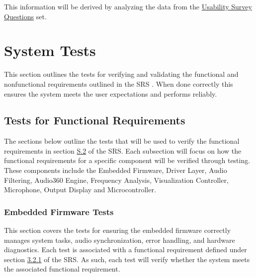 \documentclass[12pt, titlepage]{article}
\begin{document}
This information will be derived by analyzing the data from the 
\hyperref[sec:usability_survery_questions]{Usability Survey Questions} set.

\section{System Tests} \label{sec:system_tests}

This section outlines the tests for verifying and validating the functional and
nonfunctional requirements outlined in the SRS \cite{SRS}. When done correctly
this ensures the system meets the user expectations and performs reliably. 

\subsection{Tests for Functional Requirements}

The sections below outline the tests that will be used to verify the functional
requirements in section \hyperref[SRS-sec:S.2]{S.2} of the SRS. Each subsection
will focus on how the functional requirements for a specific component will be
verified through testing. These components include the Embedded Firmware, Driver
Layer, Audio Filtering, Audio360 Engine, Frequency Analysis, Visualization
Controller, Microphone, Output Display and Microcontroller. 

\subsubsection{Embedded Firmware Tests}

This section covers the tests for ensuring the embedded firmware correctly
manages system tasks, audio synchronization, error handling, and hardware
diagnostics. Each test is associated with a functional requirement defined under
section \hyperref[SRS-sec:FR1]{3.2.1} of the SRS. As such, each test will verify
whether the system meets the associated functional requirement.
\end{document}
